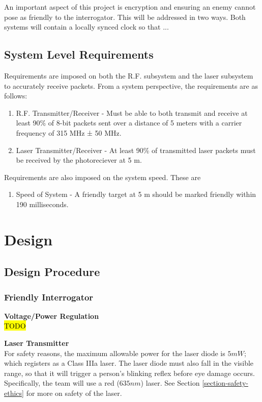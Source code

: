 \documentclass[letterpaper,10pt]{article}
\begin{document}
\begin{spacing}{1.15}
An important aspect of this project is encryption and ensuring an enemy cannot pose as friendly to the interrogator. This will be addressed in two ways. Both systems will contain a locally synced clock so that ...


\subsection{System Level Requirements}
Requirements are imposed on both the R.F. subsystem and the laser subsystem to accurately receive packets. From a system perspective, the requirements are as follows:
\begin{enumerate}
	\item R.F. Transmitter/Receiver - Must be able to both transmit and receive at least 90\% of 8-bit packets sent over a distance of 5 meters with a carrier frequency of 315 MHz ± 50 MHz.
	\item Laser Transmitter/Receiver - At least 90\% of transmitted laser packets must be received by the photoreciever at 5 m.
\end{enumerate}

Requirements are also imposed on the system speed. These are 
\begin{enumerate}
	\item Speed of System - A friendly target at 5 m should be marked friendly within 190 milliseconds.
\end{enumerate}




\section{Design}

\subsection{Design Procedure} 
\subsubsection{Friendly Interrogator}
\hspace{5mm}\textbf{Voltage/Power Regulation} \label{section:interrogator-voltage-regulation-design-procedure}
\\ \hl{TODO}

\hspace{5mm}\textbf{Laser Transmitter} \label{section:laser-transmitter-design-procedure}\\
For safety reasons, the maximum allowable power for the laser diode is $5mW$; which registers as a Class IIIa laser. The laser diode must also fall in the visible range, so that it will trigger a person's blinking reflex before eye damage occurs. Specifically, the team will use a red ($635nm$) laser. See Section \ref{section-safety-ethics} for more on safety of the laser. 


\end{spacing}
\end{document}
